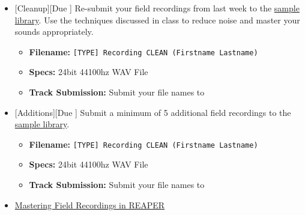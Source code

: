 \begin{itemize}[noitemsep,topsep=0pt,leftmargin=*]
	\item {}[Cleanup][Due \dSun] \newline
	      Re-submit your field recordings from last week to the \href{\#}{sample library}. Use the techniques discussed in class to reduce noise and master your sounds appropriately.
	      \begin{itemize}
		      \item \textbf{Filename:} \texttt{[TYPE] Recording CLEAN (Firstname Lastname)}
		      \item \textbf{Specs:} 24bit 44100hz WAV File
		      \item \textbf{Track Submission:} Submit your file names to \discordS
	      \end{itemize}
	\item {}[Additions][Due \dSun] \newline
	      Submit a minimum of 5 additional field recordings to the \href{\#}{sample library}.
	      \begin{itemize}
		      \item \textbf{Filename:} \texttt{[TYPE] Recording CLEAN (Firstname Lastname)}
		      \item \textbf{Specs:} 24bit 44100hz WAV File
		      \item \textbf{Track Submission:} Submit your file names to \discordS
	      \end{itemize}
	\item {} \href{https://www.youtube.com/watch?v=7BfWqRapF5E}{Mastering Field Recordings in REAPER}
\end{itemize}